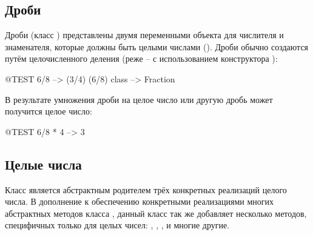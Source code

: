 \documentclass[a4paper,10pt,twoside]{book}
\begin{document}
\subsection{Дроби}

Дроби (класс ) представлены двумя переменными объекта для числителя и знаменателя, которые должны быть целыми числами (). Дроби обычно создаются путём целочисленного деления (реже --
с использованием конструктора ):

\begin{code}{@TEST}
6/8             --> (3/4)
(6/8) class --> Fraction
\end{code}

В результате умножения дроби на целое число или другую дробь может получится целое число:

\begin{code}{@TEST}
6/8 * 4 --> 3
\end{code}


\subsection{Целые числа}

Класс  является абстрактным родителем трёх конкретных реализаций целого числа. В дополнение к обеспечению конкретными реализациями многих абстрактных методов класса , данный класс так же добавляет несколько методов, специфичных только для целых чисел: , , ,  и многие другие.
\end{document}
